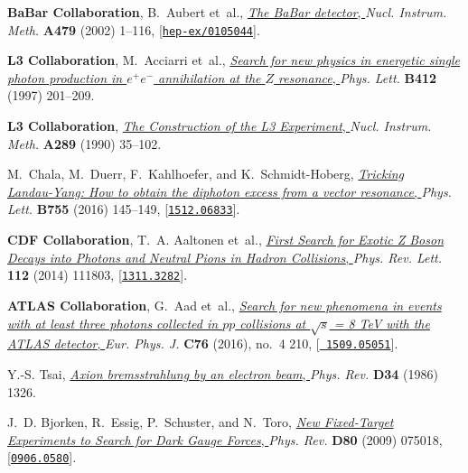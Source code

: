 \documentclass[11pt,a4paper]{article}
\begin{document}
\begin{thebibliography}{10}
{\bf BaBar Collaboration}, B.~Aubert et~al.,
  \href{http://dx.doi.org/10.1016/S0168-9002(01)02012-5}{{\it {The BaBar
  detector}}, } {\em Nucl. Instrum. Meth.} {\bf A479} (2002) 1--116,
  [\href{http://arxiv.org/abs/hep-ex/0105044}{{\tt hep-ex/0105044}}].

{\bf L3 Collaboration}, M.~Acciarri et~al.,
  \href{http://dx.doi.org/10.1016/S0370-2693(97)01003-4}{{\it {Search for new
  physics in energetic single photon production in $e^{+} e^{-}$ annihilation
  at the $Z$ resonance}}, } {\em Phys. Lett.} {\bf B412} (1997) 201--209.

{\bf L3 Collaboration},
  \href{http://dx.doi.org/10.1016/0168-9002(90)90250-A}{{\it {The Construction
  of the L3 Experiment}}, } {\em Nucl. Instrum. Meth.} {\bf A289} (1990)
  35--102.

M.~Chala, M.~Duerr, F.~Kahlhoefer, and K.~Schmidt-Hoberg,
  \href{http://dx.doi.org/10.1016/j.physletb.2016.02.006}{{\it {Tricking
  Landau-Yang: How to obtain the diphoton excess from a vector resonance}}, }
  {\em Phys. Lett.} {\bf B755} (2016) 145--149,
  [\href{http://arxiv.org/abs/1512.06833}{{\tt 1512.06833}}].

{\bf CDF Collaboration}, T.~A. Aaltonen et~al.,
  \href{http://dx.doi.org/10.1103/PhysRevLett.112.111803}{{\it {First Search
  for Exotic Z Boson Decays into Photons and Neutral Pions in Hadron
  Collisions}}, } {\em Phys. Rev. Lett.} {\bf 112} (2014) 111803,
  [\href{http://arxiv.org/abs/1311.3282}{{\tt 1311.3282}}].

{\bf ATLAS Collaboration}, G.~Aad et~al.,
  \href{http://dx.doi.org/10.1140/epjc/s10052-016-4034-8}{{\it {Search for new
  phenomena in events with at least three photons collected in $pp$ collisions
  at $\sqrt{s}$ = 8 TeV with the ATLAS detector}}, } {\em Eur. Phys. J.} {\bf
  C76} (2016), no.~4 210, [\href{http://arxiv.org/abs/1509.05051}{{\tt
  1509.05051}}].

Y.-S. Tsai, \href{http://dx.doi.org/10.1103/PhysRevD.34.1326}{{\it {Axion
  bremsstrahlung by an electron beam}}, } {\em Phys. Rev.} {\bf D34} (1986)
  1326.

J.~D. Bjorken, R.~Essig, P.~Schuster, and N.~Toro,
  \href{http://dx.doi.org/10.1103/PhysRevD.80.075018}{{\it {New Fixed-Target
  Experiments to Search for Dark Gauge Forces}}, } {\em Phys. Rev.} {\bf D80}
  (2009) 075018, [\href{http://arxiv.org/abs/0906.0580}{{\tt 0906.0580}}].


\end{thebibliography}
\end{document}
